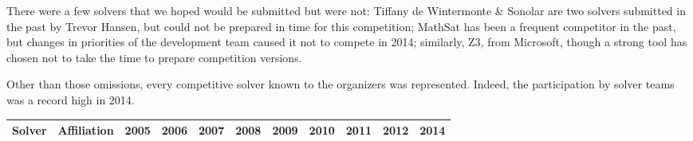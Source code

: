 \documentclass[twosize,11pt]{article}
\begin{document}
There were a few solvers that we hoped would be submitted but were not: Tiffany de Wintermonte \& Sonolar are two solvers submitted in the past by Trevor Hansen, but could not be prepared in time for this competition; MathSat has been a frequent competitor in the past, but changes in priorities of the development team caused it not to compete in 2014; similarly, Z3, from Microsoft, though a strong tool has chosen not to take the time to prepare competition versions.

Other than those omissions, every competitive solver known to the organizers was represented. Indeed, the
 participation by solver teams was a record high in 2014. 

\begin{table}[t]
\centering
\begin{tabular}{|l|l|c|c|c|c|c|c|c|c|c|}
\hline
Solver & Affiliation & 2005 & 2006 & 2007 & 2008 & 2009 & 2010 & 2011 & 2012 & 2014 \\
\hline


\end{tabular}
\end{table}
\end{document}
